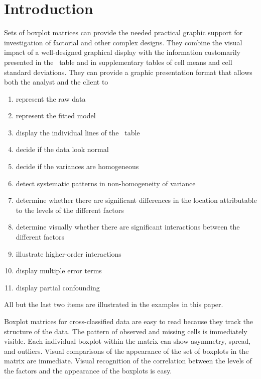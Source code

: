 \newpage
\section{Introduction}

Sets of boxplot matrices can provide the needed practical graphic
support for investigation of factorial and other complex designs.
They combine the visual impact of a well-designed graphical
display with the information customarily presented in the \ANOVA\
table and in supplementary tables of cell means and cell standard
deviations.  They can provide a graphic presentation format that
allows both the analyst and the client to

\begin{enumerate}

\item represent the raw data

\item represent the fitted model

\item display the individual lines of the \ANOVA\ table

\item decide if the data look normal

\item decide if the variances are homogeneous

\item detect systematic patterns in non-homogeneity of variance

\item determine whether there are significant differences in the
location attributable to the levels of the different factors

\item determine visually whether there are significant
interactions between the different factors

\item illustrate higher-order interactions

\item display multiple error terms

\item display partial confounding

\end{enumerate}
%
All but the last two items are illustrated in the examples in
this paper.


Boxplot matrices for cross-classified data are easy to read
because they track the structure of the data.  The pattern of
observed and missing cells is immediately visible.  Each
individual boxplot within the matrix can show asymmetry, spread,
and outliers.  Visual comparisons of the appearance of the set of
boxplots in the matrix are immediate.  Visual recognition of the
correlation between the levels of the factors and the appearance
of the boxplots is easy.

